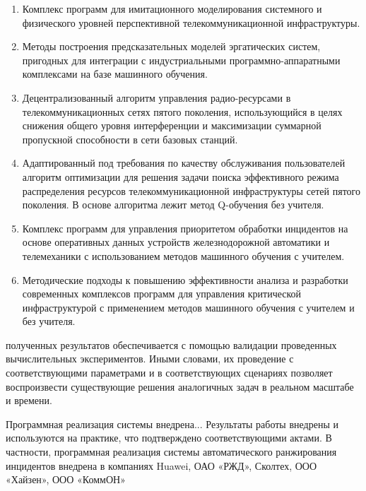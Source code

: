 {}
\begin{enumerate}
  \item Комплекс программ для имитационного моделирования системного и физического уровней перспективной телекоммуникационной инфраструктуры.
  \item Методы построения предсказательных моделей эргатических систем, пригодных для интеграции с индустриальными программно-аппаратными комплексами на базе машинного обучения.
  \item Децентрализованный алгоритм управления радио-ресурсами в телекоммуникационных сетях пятого поколения, использующийся в целях снижения общего уровня интерференции и максимизации суммарной пропускной способности в сети базовых станций.
  \item Адаптированный под требования по качеству обслуживания пользователей алгоритм оптимизации для решения задачи поиска эффективного режима распределения ресурсов телекоммуникационной инфраструктуры сетей пятого поколения. В основе алгоритма лежит метод Q-обучения без учителя.
  \item Комплекс программ для управления приоритетом обработки инцидентов на основе оперативных данных устройств железнодорожной автоматики и телемеханики с использованием методов машинного обучения с учителем.
  \item Методические подходы к повышению эффективности анализа и разработки современных комплексов программ для управления критической инфраструктурой с применением методов машинного обучения с учителем и без учителя.
\end{enumerate}

{\reliability} полученных результатов обеспечивается с помощью валидации проведенных вычислительных экспериментов. Иными словами, их проведение с соответствующими параметрами и в соответствующих сценариях позволяет воспроизвести существующие решения аналогичных задач в реальном масштабе и времени.




Программная реализация системы  внедрена... 
Результаты работы внедрены и используются на практике, что подтверждено соответствующими актами. В частности, программная реализация системы автоматического ранжирования инцидентов внедрена в компаниях Huawei, ОАО «РЖД», Сколтех, ООО «Хайзен», ООО «КоммОН» 

